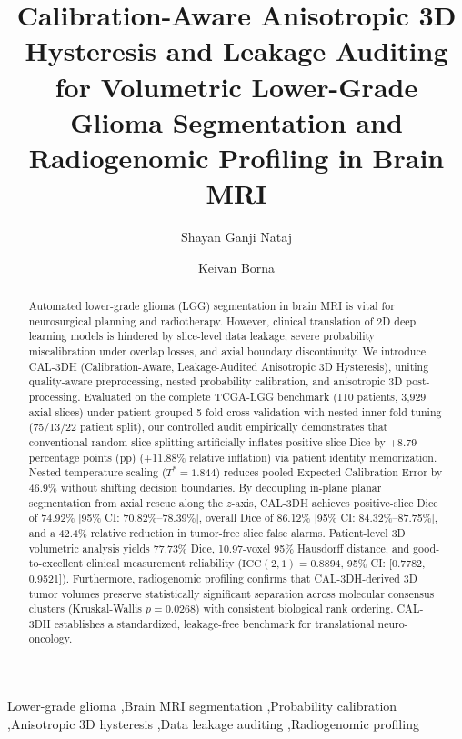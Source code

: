 \documentclass[preprint,12pt,authoryear]{elsarticle}
\begin{document}
\begin{frontmatter}

\title{Calibration-Aware Anisotropic 3D Hysteresis and Leakage Auditing for Volumetric Lower-Grade Glioma Segmentation and Radiogenomic Profiling in Brain MRI}

\author[aff1]{Shayan Ganji Nataj}

\author[aff1]{Keivan Borna}

\address[aff1]{Department of Computer Science, Faculty of Mathematics and Computer Science, Kharazmi University, Tehran, Iran}

\begin{abstract}
Automated lower-grade glioma (LGG) segmentation in brain MRI is vital for neurosurgical planning and radiotherapy. However, clinical translation of 2D deep learning models is hindered by slice-level data leakage, severe probability miscalibration under overlap losses, and axial boundary discontinuity. We introduce CAL-3DH (Calibration-Aware, Leakage-Audited Anisotropic 3D Hysteresis), uniting quality-aware preprocessing, nested probability calibration, and anisotropic 3D post-processing. Evaluated on the complete TCGA-LGG benchmark (110 patients, 3,929 axial slices) under patient-grouped 5-fold cross-validation with nested inner-fold tuning (75/13/22 patient split), our controlled audit empirically demonstrates that conventional random slice splitting artificially inflates positive-slice Dice by +8.79 percentage points (pp) (+11.88\% relative inflation) via patient identity memorization. Nested temperature scaling ($T^* = 1.844$) reduces pooled Expected Calibration Error by 46.9\% without shifting decision boundaries. By decoupling in-plane planar segmentation from axial rescue along the $z$-axis, CAL-3DH achieves positive-slice Dice of 74.92\% [95\% CI: 70.82\%--78.39\%], overall Dice of 86.12\% [95\% CI: 84.32\%--87.75\%], and a 42.4\% relative reduction in tumor-free slice false alarms. Patient-level 3D volumetric analysis yields 77.73\% Dice, 10.97-voxel 95\% Hausdorff distance, and good-to-excellent clinical measurement reliability ($\text{ICC}(2,1) = 0.8894$, 95\% CI: [0.7782, 0.9521]). Furthermore, radiogenomic profiling confirms that CAL-3DH-derived 3D tumor volumes preserve statistically significant separation across molecular consensus clusters (Kruskal-Wallis $p = 0.0268$) with consistent biological rank ordering. CAL-3DH establishes a standardized, leakage-free benchmark for translational neuro-oncology.
\end{abstract}

\begin{keyword}
Lower-grade glioma \sep Brain MRI segmentation \sep Probability calibration \sep Anisotropic 3D hysteresis \sep Data leakage auditing \sep Radiogenomic profiling
\end{keyword}

\end{frontmatter}
\end{document}
